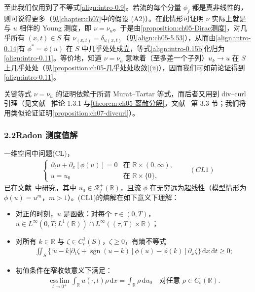 \documentclass[../main.tex]{subfiles}
\begin{document}
至此我们仅用到了不等式\eqref{align:intro-0.9}。若流的每个分量 $\phi_j$ 都是真非线性的，则可说得更多（见\cref{chapter:ch07}中的假设 (A2)）。在此情形可证明 $\nu$ 实际上就是与 $u$ 相伴的 Young 测度，即 $\nu=\nu_u$。于是由\cref{proposition:ch05-Dirac测度}，对几乎所有 $(x,t)\in S$ 有 $\nu_{(x,t)}=\delta_{u(x,t)}$（见\eqref{align:ch05-5.53}），从而由\eqref{align:intro-0.14}有 $\phi^*=\phi(u)$ 在 $S$ 中几乎处处成立，等式\eqref{align:intro-0.15b}化归为\eqref{align:intro-0.11}。等价地，知道 $\nu=\nu_u$ 意味着（至多差一个子列）$u_k\to u$ 在 $S$ 上几乎处处（见\cref{proposition:ch05-几乎处处收敛}(ii)），因而我们可如前论证得到\eqref{align:intro-0.11}。

关键等式 $\nu=\nu_u$ 的证明依赖于所谓 Murat--Tartar 等式，而后者又用到 div--curl 引理（见文献~\cite{ref46} 推论 1.3.1 与\cref{theorem:ch05-离散分解}，文献~\cite{ref68} 第 3.3 节；我们将用类似论证证明\cref{proposition:ch07-divcurl}）。

\subsubsection*{2.2\quad Radon 测度值解}\label{subsubsection:intro-radon1d}

一维空间中问题(CL)，
\begin{align*}
\begin{cases}
\partial_t u + \partial_x[\phi(u)] = 0 & \text{在 }\mathbb{R}\times(0,\infty),\\
u=u_0 & \text{在 }\mathbb{R}\times\{0\},
\end{cases}
\qquad(CL1)
\end{align*}
已在文献~\cite{ref67}中研究，其中 $u_0\in\mathscr{R}^+_f(\mathbb{R})$，且流 $\phi$ 在无穷远为超线性（模型情形为 $\phi(u)=u^m$，$m>1$）。(CL1)的熵解在如下意义下理解：
\begin{itemize}
\item 对正的时刻，$u$ 是函数：对每个 $\tau\in(0,T)$，$u\in L^\infty(0,T;L^1(\mathbb{R}))\cap L^\infty((\tau,T)\times\mathbb{R})$；
\item 对所有 $k\in\mathbb{R}$ 与 $\zeta\in C^1_c(S)$，$\zeta\geqslant0$，有熵不等式
\begin{align*}
\iint_S\{|u-k|\partial_t\zeta + \operatorname{sgn}(u-k)[\phi(u)-\phi(k)]\partial_x\zeta\}\,\mathrm{d}x\,\mathrm{d}t \geqslant 0;
\end{align*}
\item 初值条件在窄收敛意义下满足：
\begin{align*}
\operatorname*{ess\,lim}_{t\to0^+}\int_{\mathbb{R}}u(\cdot,t)\rho\,\mathrm{d}x
= \int_{\mathbb{R}}\rho\,\mathrm{d}u_0
\quad \text{对任意 }\rho\in C_b(\mathbb{R}).
\end{align*}
\end{itemize}
\end{document}
